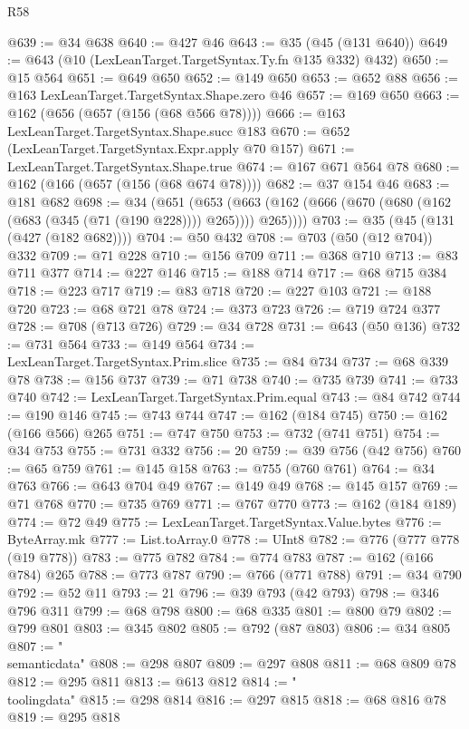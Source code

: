 \begin{lexlean}{R58}
\begin{coremodule}
{{@639 := @34 @638
@640 := @427 @46
@643 := @35 (@45 (@131 @640))
@649 := @643 (@10 (LexLeanTarget.TargetSyntax.Ty.fn @135 @332) @432)
@650 := @15 @564
@651 := @649 @650
@652 := @149 @650
@653 := @652 @88
@656 := @163 LexLeanTarget.TargetSyntax.Shape.zero @46
@657 := @169 @650
@663 := @162 (@656 (@657 (@156 (@68 @566 @78))))
@666 := @163 LexLeanTarget.TargetSyntax.Shape.succ @183
@670 := @652 (LexLeanTarget.TargetSyntax.Expr.apply @70 @157)
@671 := LexLeanTarget.TargetSyntax.Shape.true
@674 := @167 @671 @564 @78
@680 := @162 (@166 (@657 (@156 (@68 @674 @78))))
@682 := @37 @154 @46
@683 := @181 @682
@698 := @34
    (@651
      (@653 (@663 (@162 (@666 (@670 (@680 (@162 (@683 (@345 (@71 (@190 @228)))) @265)))) @265))))
@703 := @35 (@45 (@131 (@427 (@182 @682))))
@704 := @50 @432
@708 := @703 (@50 (@12 @704)) @332
@709 := @71 @228
@710 := @156 @709
@711 := @368 @710
@713 := @83 @711 @377
@714 := @227 @146
@715 := @188 @714
@717 := @68 @715 @384
@718 := @223 @717
@719 := @83 @718
@720 := @227 @103
@721 := @188 @720
@723 := @68 @721 @78
@724 := @373 @723
@726 := @719 @724 @377
@728 := @708 (@713 @726)
@729 := @34 @728
@731 := @643 (@50 @136)
@732 := @731 @564
@733 := @149 @564
@734 := LexLeanTarget.TargetSyntax.Prim.slice
@735 := @84 @734
@737 := @68 @339 @78
@738 := @156 @737
@739 := @71 @738
@740 := @735 @739
@741 := @733 @740
@742 := LexLeanTarget.TargetSyntax.Prim.equal
@743 := @84 @742
@744 := @190 @146
@745 := @743 @744
@747 := @162 (@184 @745)
@750 := @162 (@166 @566) @265
@751 := @747 @750
@753 := @732 (@741 @751)
@754 := @34 @753
@755 := @731 @332
@756 := 20
@759 := @39 @756 (@42 @756)
@760 := @65 @759
@761 := @145 @158
@763 := @755 (@760 @761)
@764 := @34 @763
@766 := @643 @704 @49
@767 := @149 @49
@768 := @145 @157
@769 := @71 @768
@770 := @735 @769
@771 := @767 @770
@773 := @162 (@184 @189)
@774 := @72 @49
@775 := LexLeanTarget.TargetSyntax.Value.bytes
@776 := ByteArray.mk
@777 := List.toArray.{0}
@778 := UInt8
@782 := @776 (@777 @778 (@19 @778))
@783 := @775 @782
@784 := @774 @783
@787 := @162 (@166 @784) @265
@788 := @773 @787
@790 := @766 (@771 @788)
@791 := @34 @790
@792 := @52 @11
@793 := 21
@796 := @39 @793 (@42 @793)
@798 := @346 @796 @311
@799 := @68 @798
@800 := @68 @335
@801 := @800 @79
@802 := @799 @801
@803 := @345 @802
@805 := @792 (@87 @803)
@806 := @34 @805
@807 := "\\semanticdata"
@808 := @298 @807
@809 := @297 @808
@811 := @68 @809 @78
@812 := @295 @811
@813 := @613 @812
@814 := "\\toolingdata"
@815 := @298 @814
@816 := @297 @815
@818 := @68 @816 @78
@819 := @295 @818
}}
\end{coremodule}
\end{lexlean}
